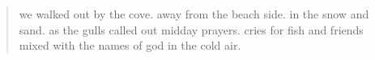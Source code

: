 

\begin{verse}
we walked out by the cove.
away from the beach side.
in the snow and sand.
as the gulls called out midday prayers.
cries for fish and friends mixed
with the names of god in the cold air.
\end{verse}
